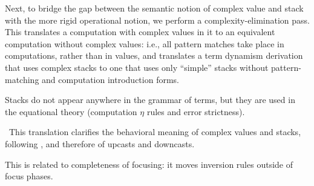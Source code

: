 \documentclass[acmsmall,screen,12pt]{acmart}
\begin{document}
Next, to bridge the gap between the semantic notion of complex value
and stack with the more rigid operational notion, we perform a
complexity-elimination pass.
%
This translates a computation with complex values in it to an equivalent
computation without complex values: i.e., all pattern matches take place
in computations, rather than in values, and translates a term dynamism
derivation that uses complex stacks to one that uses only ``simple''
stacks without pattern-matching and computation introduction forms.
%
\begin{longonly}
  Stacks do not appear anywhere in the grammar of terms, but they are
used in the equational theory (computation $\eta$ rules and error
strictness).
\end{longonly}
%
\ This translation clarifies the behavioral meaning of complex values and
stacks, following \citet{munchmaccagnoni14nonassociative,
  fuhrmann1999direct}, and therefore of upcasts and downcasts.
\begin{longonly}
This is related to completeness of focusing: it moves inversion rules
outside of focus phases.
\end{longonly}
\end{document}
